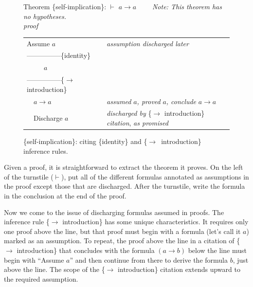 {\begin{figure}
Theorem \{self-implication\}: $\vdash$ $a \rightarrow a$ ~~~~\emph{Note: This theorem has no hypotheses.}\\
\emph{proof}
\begin{center}
\begin{spacing}{0.9}
\begin{tabular}{ll}
Assume $a$                  &\emph{assumption discharged later}\\
---------------\{identity\} &\\
~~~~~$a$                    &\\
---------------\{$\rightarrow$ introduction\} &\\
~~$a \rightarrow a$         &\emph{assumed} $a$\emph{, proved} $a$\emph{, conclude} $a \rightarrow a$\\
~~Discharge $a$             &\emph{discharged by} \{$\rightarrow$ introduction\} \emph{citation}, \emph{as promised}\\
\end{tabular}
\end{spacing}
\end{center}
\caption{\{self-implication\}: citing  \{identity\} and \{$\rightarrow$\ introduction\} inference rules.}
\label{fig:or-self-imp-proof}
\end{figure}

Given a proof, it is straightforward to extract
the theorem it proves.
On the left of the turnstile ($\vdash$), put all of the different
formulas annotated as assumptions in the proof
except those that are discharged.
After the turnstile, write the formula in the
conclusion at the end of the proof.

Now we come to the issue of
discharging
formulas assumed in proofs.
The inference rule \{$\rightarrow$ introduction\}
has some unique characteristics.
It requires only one proof above the line,
but that proof must begin with a formula
(let's call it $a$)
marked as an assumption.
To repeat, the proof above the line in a citation of
\{$\rightarrow$ introduction\} that
concludes with the formula $(a \rightarrow b)$
below the line
must begin with ``Assume $a$'' and
then continue from there to derive the formula $b$, just above the line.
The scope of the \{$\rightarrow$ introduction\} citation
extends upward to the required assumption.

}
